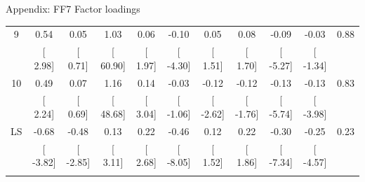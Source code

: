 \documentclass{beamer}
\begin{document}
{\begin{frame}{Appendix: FF7 Factor loadings}
\begin{table}[!htbp]
\begin{tabular}{@{\extracolsep{-5pt}} ccccccccccc}
9 & 0.54 & 0.05 & 1.03 & 0.06 & -0.10 & 0.05 & 0.08 & -0.09 & -0.03 & 0.88 \\ 
 & [ 2.98] & [ 0.71] & [ 60.90] & [ 1.97] & [ -4.30] & [ 1.51] & [ 1.70] & [ -5.27] & [ -1.34] &  \\ 
10 & 0.49 & 0.07 & 1.16 & 0.14 & -0.03 & -0.12 & -0.12 & -0.13 & -0.13 & 0.83 \\ 
 & [ 2.24] & [ 0.69] & [ 48.68] & [ 3.04] & [ -1.06] & [ -2.62] & [ -1.76] & [ -5.74] & [ -3.98] &  \\ 
LS & -0.68 & -0.48 & 0.13 & 0.22 & -0.46 & 0.12 & 0.22 & -0.30 & -0.25 & 0.23 \\ 
 & [ -3.82] & [ -2.85] & [ 3.11] & [ 2.68] & [ -8.05] & [ 1.52] & [ 1.86] & [ -7.34] & [ -4.57] &  \\ 
\hline \\[-1.8ex] 
\end{tabular} 
\end{table} 
\end{frame}
}
\end{document}
